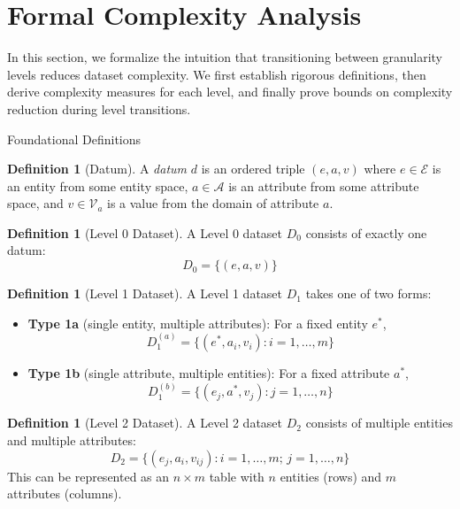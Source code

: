 \documentclass[]{hdsr}
\makeatletter
\def\subsection{\@startsection{subsection}{2}%
  \z@{.5\linespacing\@plus.7\linespacing}{.5\linespacing}%
  {\normalfont\bfseries}}
\theoremstyle{plain}      %
\theoremstyle{definition} %
\newtheorem{definition}[theorem]{Definition}
\theoremstyle{remark}     %
\makeatother
\begin{document}
\section{Formal Complexity Analysis}
\label{sec:complexity}

In this section, we formalize the intuition that transitioning between granularity levels reduces dataset complexity. We first establish rigorous definitions, then derive complexity measures for each level, and finally prove bounds on complexity reduction during level transitions.

\subsection{Foundational Definitions}

\begin{definition}[Datum]
\label{def:datum}
A \emph{datum} $d$ is an ordered triple $(e, a, v)$ where $e \in \mathcal{E}$ is an entity from some entity space, $a \in \mathcal{A}$ is an attribute from some attribute space, and $v \in \mathcal{V}_a$ is a value from the domain of attribute $a$.
\end{definition}

\begin{definition}[Level 0 Dataset]
\label{def:level0}
A Level 0 dataset $D_0$ consists of exactly one datum:
\[
D_0 = \{(e, a, v)\}
\]
\end{definition}

\begin{definition}[Level 1 Dataset]
\label{def:level1}
A Level 1 dataset $D_1$ takes one of two forms:
\begin{itemize}
    \item \textbf{Type 1a} (single entity, multiple attributes): For a fixed entity $e^*$,
    \[
    D_1^{(a)} = \{(e^*, a_i, v_i) : i = 1, \ldots, m\}
    \]
    \item \textbf{Type 1b} (single attribute, multiple entities): For a fixed attribute $a^*$,
    \[
    D_1^{(b)} = \{(e_j, a^*, v_j) : j = 1, \ldots, n\}
    \]
\end{itemize}
\end{definition}

\begin{definition}[Level 2 Dataset]
\label{def:level2}
A Level 2 dataset $D_2$ consists of multiple entities and multiple attributes:
\[
D_2 = \{(e_j, a_i, v_{ij}) : i = 1, \ldots, m; \, j = 1, \ldots, n\}
\]
This can be represented as an $n \times m$ table with $n$ entities (rows) and $m$ attributes (columns).
\end{definition}
\end{document}
